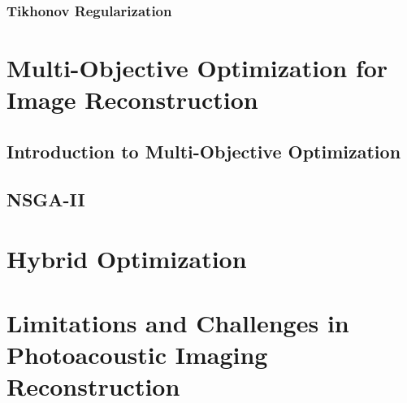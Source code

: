 \subsubsection{Tikhonov Regularization} \label{sec:lit:first:three:two}

\section{Multi-Objective Optimization for Image Reconstruction} \label{sec:lit:second}

\subsection{Introduction to Multi-Objective Optimization} \label{sec:lit:second:one}

\subsection{NSGA-II} \label{sec:lit:second:two}

\section{Hybrid Optimization} \label{sec:lit:second:three}

\section{Limitations and Challenges in Photoacoustic Imaging Reconstruction}

